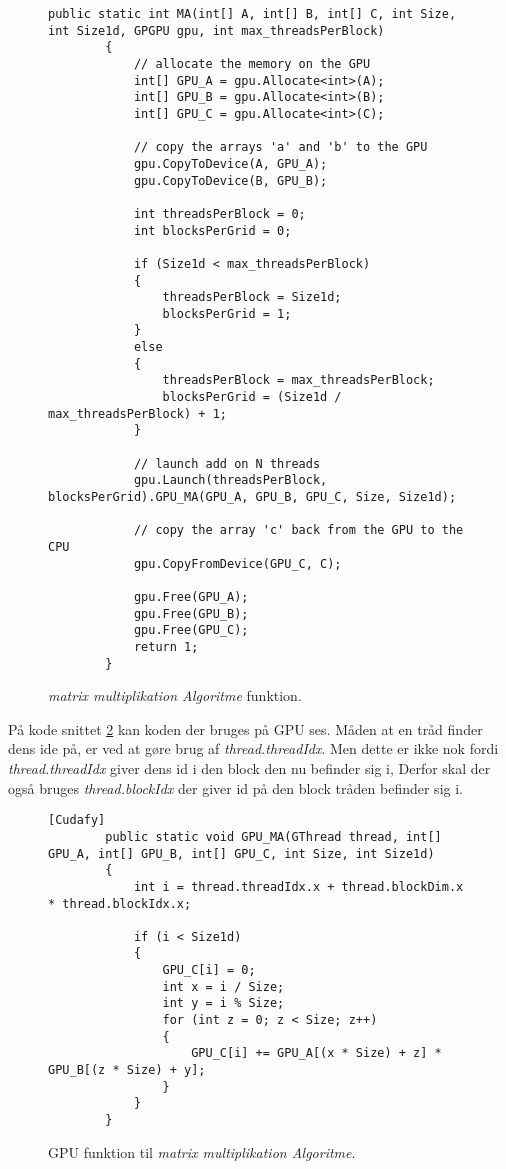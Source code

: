 \begin{figure}[!ht]
    \centering
    \lstset{style=sharpc}
	\begin{lstlisting}
public static int MA(int[] A, int[] B, int[] C, int Size, int Size1d, GPGPU gpu, int max_threadsPerBlock)
        {
            // allocate the memory on the GPU
            int[] GPU_A = gpu.Allocate<int>(A);
            int[] GPU_B = gpu.Allocate<int>(B);
            int[] GPU_C = gpu.Allocate<int>(C);

            // copy the arrays 'a' and 'b' to the GPU
            gpu.CopyToDevice(A, GPU_A);
            gpu.CopyToDevice(B, GPU_B);

            int threadsPerBlock = 0;
            int blocksPerGrid = 0;

            if (Size1d < max_threadsPerBlock)
            {
                threadsPerBlock = Size1d;
                blocksPerGrid = 1;
            }
            else
            {
                threadsPerBlock = max_threadsPerBlock;
                blocksPerGrid = (Size1d / max_threadsPerBlock) + 1;
            }

            // launch add on N threads
            gpu.Launch(threadsPerBlock, blocksPerGrid).GPU_MA(GPU_A, GPU_B, GPU_C, Size, Size1d);

            // copy the array 'c' back from the GPU to the CPU
            gpu.CopyFromDevice(GPU_C, C);

            gpu.Free(GPU_A);
            gpu.Free(GPU_B);
            gpu.Free(GPU_C);
            return 1;
        }
	\end{lstlisting}
    \caption{\textit{matrix multiplikation Algoritme} funktion.}
    \label{fig:MA}
\end{figure}

På kode snittet \ref{fig:GPU_MA} kan koden der bruges på GPU ses. Måden at en tråd finder dens ide på, er ved at gøre brug af \textit{thread.threadIdx}. Men dette er ikke nok fordi \textit{thread.threadIdx} giver dens id i den block den nu befinder sig i, Derfor skal der også bruges \textit{thread.blockIdx} der giver id på den block tråden befinder sig i.

\begin{figure}[!ht]
    \centering
    \lstset{style=sharpc}
	\begin{lstlisting}
[Cudafy]
        public static void GPU_MA(GThread thread, int[] GPU_A, int[] GPU_B, int[] GPU_C, int Size, int Size1d)
        {
            int i = thread.threadIdx.x + thread.blockDim.x * thread.blockIdx.x;

            if (i < Size1d)
            {
                GPU_C[i] = 0;
                int x = i / Size;
                int y = i % Size;
                for (int z = 0; z < Size; z++)
                {
                    GPU_C[i] += GPU_A[(x * Size) + z] * GPU_B[(z * Size) + y];
                }
            }
        }
	\end{lstlisting}
    \caption{GPU funktion til \textit{matrix multiplikation Algoritme}.}
    \label{fig:GPU_MA}
\end{figure}

